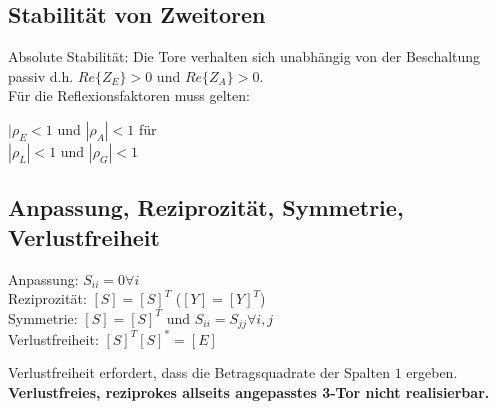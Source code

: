 \documentclass[english]{latex4ei/latex4ei_sheet}
\begin{document}
\begin{sectionbox}
	\subsection{Stabilität von Zweitoren}
	Absolute Stabilität: Die Tore verhalten sich unabhängig von der Beschaltung passiv d.h. $Re\{Z_E\} > 0$ und $Re\{Z_A\} > 0$.\\
	Für die Reflexionsfaktoren muss gelten:\\
	\begin{emphbox}
		$|\rho_E < 1$ und $|\rho_A| < 1$ für\\
		
		$|\rho_L| < 1$ und $|\rho_G| < 1$
	\end{emphbox}
\end{sectionbox}



\begin{sectionbox}
	\subsection{Anpassung, Reziprozität, Symmetrie, Verlustfreiheit}
	\begin{emphbox}
		Anpassung: $S_{ii} = 0 \forall i$\\
		Reziprozität: $[S] = [S]^T$ ($[Y] = [Y]^T$)\\
		Symmetrie: $[S] = [S]^T$ und $S_{ii} = S_{jj} \forall i,j$\\
		Verlustfreiheit: $[S]^T[S]^* = [E]$
	\end{emphbox}
	Verlustfreiheit erfordert, dass die Betragsquadrate der Spalten $1$ ergeben.\\
	\textbf{Verlustfreies, reziprokes allseits angepasstes 3-Tor nicht realisierbar.}
\end{sectionbox}
\end{document}

